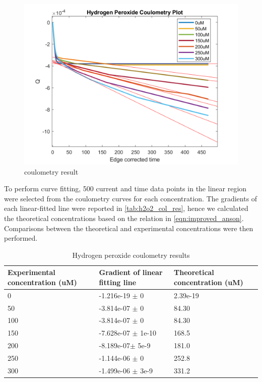 \begin{figure}[H]
    \centering
    \includegraphics[width=.5\textwidth]{img/h2o2_coulometry.png}
    \caption{coulometry result}
    \label{fig:h2o2_col}
\end{figure}\vspace{-.8cm}
\noindent To perform curve fitting, 500 current and time data points in the linear region were selected from the coulometry curves for each concentration. The gradients of each linear-fitted line were reported in \autoref{tab:h2o2_col_res}, hence we calculated the theoretical concentrations based on the relation in \autoref{eqn:improved_anson}. Comparisons between the theoretical and experimental concentrations were then performed.
\begin{table}[H]
    \centering
    \begin{tabularx}{.45\textwidth}{|p{}|p{}|p{}|}\hline
        Experimental concentration (uM) & Gradient of linear fitting line & Theoretical concentration (uM)  \\ \hline
        0   & -1.216e-19 $\pm$ 0 & 2.39e-19\\ \hline
        50  & -3.814e-07 $\pm$ 0 & 84.30\\ \hline
        100 & -3.814e-07 $\pm$ 0 & 84.30\\ \hline
        150 & -7.628e-07 $\pm$ 1e-10 & 168.5\\ \hline
        200 &  -8.189e-07$\pm$ 5e-9 & 181.0\\ \hline
        250 & -1.144e-06 $\pm$ 0 & 252.8\\ \hline
        300 & -1.499e-06 $\pm$ 3e-9 & 331.2\\ \hline
    \end{tabularx}
    \caption{Hydrogen peroxide coulometry results}
    \label{tab:h2o2_col_res}
\end{table}

